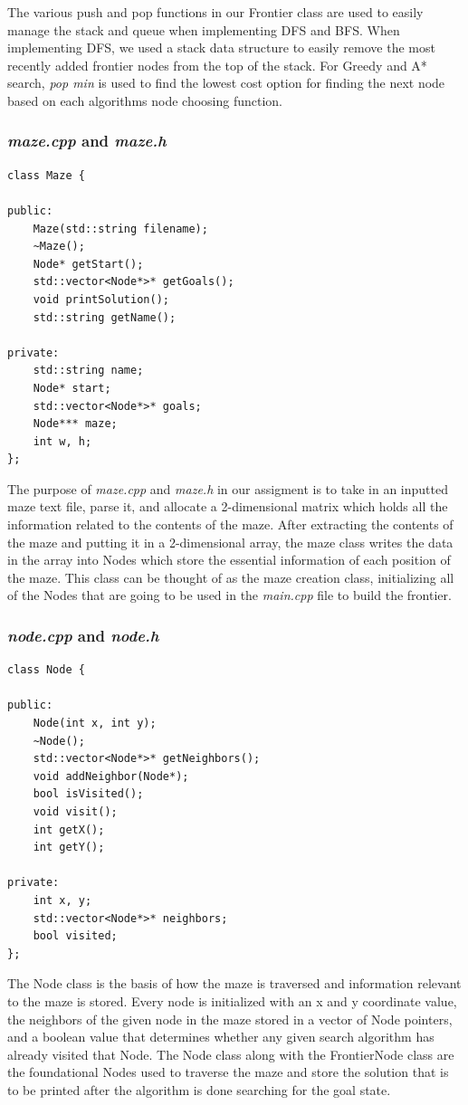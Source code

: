 \documentclass[titlepage]{article}
\begin{document}
The various push and pop functions in our Frontier class are used to easily manage the stack and queue when implementing DFS and BFS. When implementing DFS, we used a stack data structure to easily remove the most recently added frontier nodes from the top of the stack. For Greedy and A* search, \textit{pop min} is used to find the lowest cost option for finding the next node based on each algorithms node choosing function. 

\subsubsection{\textit{maze.cpp} and \textit{maze.h}}
\begin{lstlisting}
class Maze {

public:
    Maze(std::string filename);
    ~Maze();
    Node* getStart();
    std::vector<Node*>* getGoals();
    void printSolution();
    std::string getName();

private:
    std::string name;
    Node* start;
    std::vector<Node*>* goals;
    Node*** maze;
    int w, h;
};
\end{lstlisting}

The purpose of \textit{maze.cpp} and \textit{maze.h} in our assigment is to take in an inputted maze text file, parse it, and allocate a 2-dimensional matrix which holds all the information related to the contents of the maze. After extracting the contents of the maze and putting it in a 2-dimensional array, the maze class writes the data in the array into Nodes which store the essential information of each position of the maze. This class can be thought of as the maze creation class, initializing all of the Nodes that are going to be used in the \textit{main.cpp} file to build the frontier.

\newpage

\subsubsection{\textit{node.cpp} and \textit{node.h}}
\begin{lstlisting}
class Node {

public:
    Node(int x, int y);
    ~Node();
    std::vector<Node*>* getNeighbors();
    void addNeighbor(Node*);
    bool isVisited();
    void visit();
    int getX();
    int getY();

private:
    int x, y;
    std::vector<Node*>* neighbors;
    bool visited;
};
\end{lstlisting}
The Node class is the basis of how the maze is traversed and information relevant to the maze is stored. Every node is initialized with an x and y coordinate value, the neighbors of the given node in the maze stored in a vector of Node pointers, and a boolean value that determines whether any given search algorithm has already visited that Node. The Node class along with the FrontierNode class are the foundational Nodes used to traverse the maze and store the solution that is to be printed after the algorithm is done searching for the goal state. 
\end{document}
